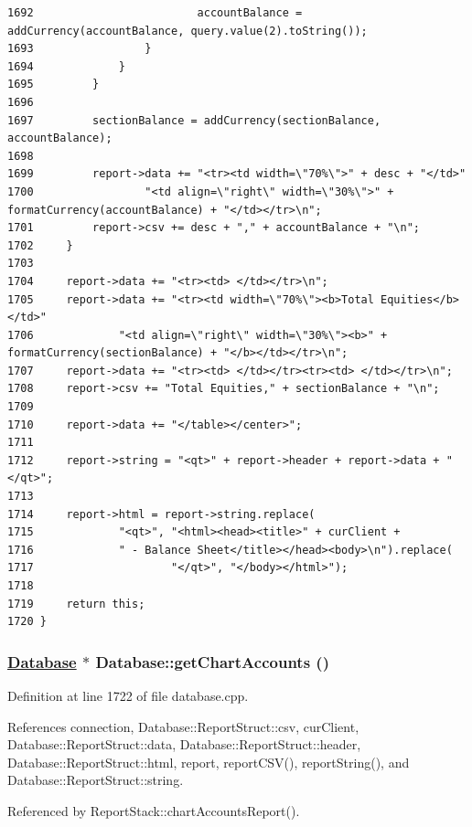 \begin{verbatim}
1692                         accountBalance = addCurrency(accountBalance, query.value(2).toString());
1693                 }
1694             }
1695         }
1696 
1697         sectionBalance = addCurrency(sectionBalance, accountBalance);
1698 
1699         report->data += "<tr><td width=\"70%\">" + desc + "</td>"
1700                 "<td align=\"right\" width=\"30%\">" + formatCurrency(accountBalance) + "</td></tr>\n";
1701         report->csv += desc + "," + accountBalance + "\n";
1702     }
1703     
1704     report->data += "<tr><td> </td></tr>\n";
1705     report->data += "<tr><td width=\"70%\"><b>Total Equities</b></td>"
1706             "<td align=\"right\" width=\"30%\"><b>" + formatCurrency(sectionBalance) + "</b></td></tr>\n";
1707     report->data += "<tr><td> </td></tr><tr><td> </td></tr>\n";
1708     report->csv += "Total Equities," + sectionBalance + "\n";
1709 
1710     report->data += "</table></center>";
1711 
1712     report->string = "<qt>" + report->header + report->data + "</qt>";
1713     
1714     report->html = report->string.replace(
1715             "<qt>", "<html><head><title>" + curClient +
1716             " - Balance Sheet</title></head><body>\n").replace(
1717                     "</qt>", "</body></html>");
1718 
1719     return this;
1720 }
\end{verbatim}\normalsize 


\hypertarget{classDatabase_a25}{
\subsubsection[getChartAccounts]{\setlength{\rightskip}{0pt plus 5cm}\hyperlink{classDatabase}{Database} $\ast$ Database::get\-Chart\-Accounts ()}}
\label{classDatabase_a25}


Definition at line 1722 of file database.cpp.

References connection, Database::Report\-Struct::csv, cur\-Client, Database::Report\-Struct::data, Database::Report\-Struct::header, Database::Report\-Struct::html, report, report\-CSV(), report\-String(), and Database::Report\-Struct::string.

Referenced by Report\-Stack::chart\-Accounts\-Report().

